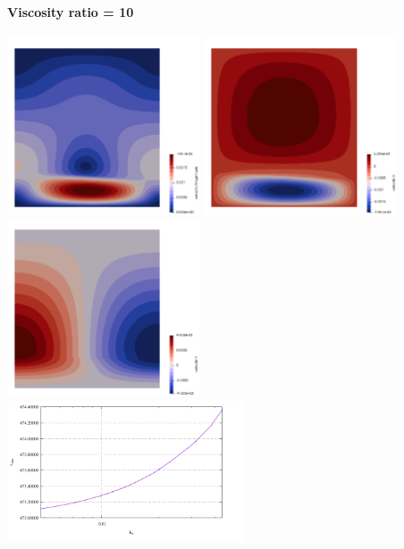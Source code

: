 \newpage
\paragraph{Viscosity ratio = 10}

\begin{center}
\includegraphics[width=5.7cm]{python_codes/fieldstone_25/results/010_100/vel}
\includegraphics[width=5.7cm]{python_codes/fieldstone_25/results/010_100/u}
\includegraphics[width=5.7cm]{python_codes/fieldstone_25/results/010_100/v}\\
\includegraphics[width=7cm]{python_codes/fieldstone_25/results/vrms_010.pdf}

\end{center}
